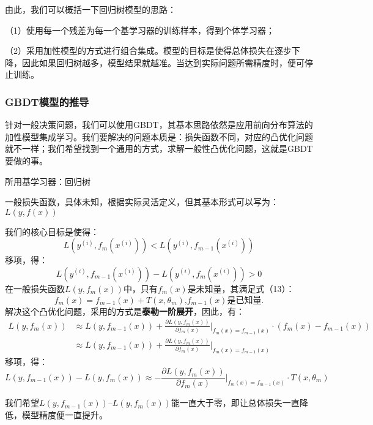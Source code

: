 由此，我们可以概括一下回归树模型的思路：

（1）使用每一个残差为每一个基学习器的训练样本，得到个体学习器；

（2）采用加性模型的方式进行组合集成。模型的目标是使得总体损失在逐步下降，因此如果回归树越多，模型结果就越准。当达到实际问题所需精度时，便可停止训练。

\subsubsection{GBDT模型的推导}
针对一般决策问题，我们可以使用GBDT，其基本思路依然是应用前向分布算法的加性模型集成学习。我们要解决的问题本质是：损失函数不同，对应的凸优化问题就不一样；我们希望找到一个通用的方式，求解一般性凸优化问题，这就是GBDT要做的事。

所用基学习器：回归树

一般损失函数，具体未知，根据实际灵活定义，但其基本形式可以写为：$L(y,f(x))$

我们的核心目标是使得：
\begin{equation}L(y^{(i)},f_m(x^{(i)}))<L(y^{(i)},f_{m-1}(x^{(i)}))\end{equation}
移项，得：
\begin{equation}L(y^{(i)},f_{m-1}(x^{(i)}))-L(y^{(i)},f_m(x^{(i)}))>0\end{equation}
在一般损失函数$L(y,f_m(x))$中，只有$f_m(x)$是未知量，其满足式（13）：
\begin{equation}f_m(x)=f_{m-1}(x)+T(x,\theta_m)\text{,}f_{m-1}(x)\text{是已知量}.\end{equation}
解决这个凸优化问题，采用的方式是\textbf{泰勒一阶展开}，因此，有：
\begin{equation}
	\begin{aligned}
		L(y,f_m(x)) &\approx L(y,f_{m-1}(x)) + \frac{\partial L(y,f_m(x))}{\partial f_m(x)}\Bigg|_{f_m(x)=f_{m-1}(x)} \cdot (f_m(x) - f_{m-1}(x)) \\
		&\approx L(y,f_{m-1}(x)) + \frac{\partial L(y,f_m(x))}{\partial f_m(x)}\Bigg|_{f_m(x)=f_{m-1}(x)}
	\end{aligned}
\end{equation}
移项，得：
\begin{equation}L(y,f_{m-1}(x))-L(y,f_m(x))\approx-\frac{\partial L(y,f_m(x))}{\partial f_m(x)}\Bigg|_{f_m(x)=f_{m-1}(x)}\cdot T(x,\theta_m)\end{equation}

我们希望$L(y,f_{m-1}(x))–L(y,f_m(x))$能一直大于零，即让总体损失一直降低，模型精度便一直提升。

